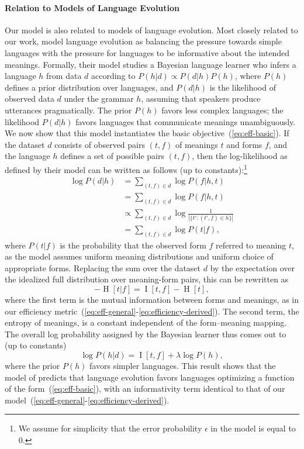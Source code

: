 \documentclass[10pt,twoside,lineno]{article}
\begin{document}
\paragraph{Relation to Models of Language Evolution}
Our model is also related to models of language evolution.
Most closely related to our work, \citet{kirby2015compression} model language evolution as balancing the pressure towards simple languages with the pressure for languages to be informative about the intended meanings.
Formally, their model studies a Bayesian language learner who infers a language $h$ from data $d$ according to $P(h|d) \propto P(d|h) P(h)$, where $P(h)$ defines a prior distribution over languages, and $P(d|h)$ is the likelihood of observed data $d$ under the grammar $h$, assuming that speakers produce utterances pragmatically.
The prior $P(h)$ favors less complex languages; the likelihood $P(d|h)$ favors languages that communicate meanings unambiguously.
We now show that this model instantiates the basic objective~(\ref{eq:eff-basic}). 
If the dataset $d$ consists of observed pairs $(t,f)$ of meanings $t$ and forms $f$, and the language $h$ defines a set of possible pairs $(t,f)$, then the log-likelihood as defined by their model can be written as follows (up to constants):\footnote{We assume for simplicity that the error probability $\epsilon$ in the model is equal to $0$.}
\begin{align}
  \nonumber
  \log P(d|h) &= \sum_{(t,f) \in d} \log P(f|h,t) \\
  \nonumber
  & = \sum_{(t,f) \in d} \log P(f|h,t) \\
  \nonumber
  & \propto \sum_{(t,f) \in d} \log \frac{1}{|\{t' : (t', f) \in h\}|} \\
  \nonumber
  & = \sum_{(t,f) \in d} \log P(t|f),
\end{align}
where $P(t|f)$ is the probability that the observed form $f$ referred to meaning $t$, as the model assumes uniform meaning distributions and uniform choice of appropriate forms.
Replacing the sum over the dataset $d$ by the expectation over the idealized full distribution over meaning-form pairs, this can be rewritten as 
\begin{equation}
- \operatorname{H}[t|f] = \operatorname{I}[t, f] - \operatorname{H}[t],
\end{equation}
where the first term is the mutual information between forms and meanings, as in our efficiency metric~(\ref{eq:eff-general}-\ref{eq:efficiency-derived}).
The second term, the entropy of meanings, is a constant independent of the form--meaning mapping.
The overall log probability assigned by the Bayesian learner thus comes out to (up to constants)
\begin{equation}
\log P(h|d) = \operatorname{I}[t, f] + \lambda \log P(h),
\end{equation}
where the prior $P(h)$ favors simpler languages.
This result shows that the model of \citet{kirby2015compression} predicts that language evolution favors languages optimizing a function of the form~(\ref{eq:eff-basic}), with an informativity term identical to that of our model~(\ref{eq:eff-general}-\ref{eq:efficiency-derived}).
\end{document}
